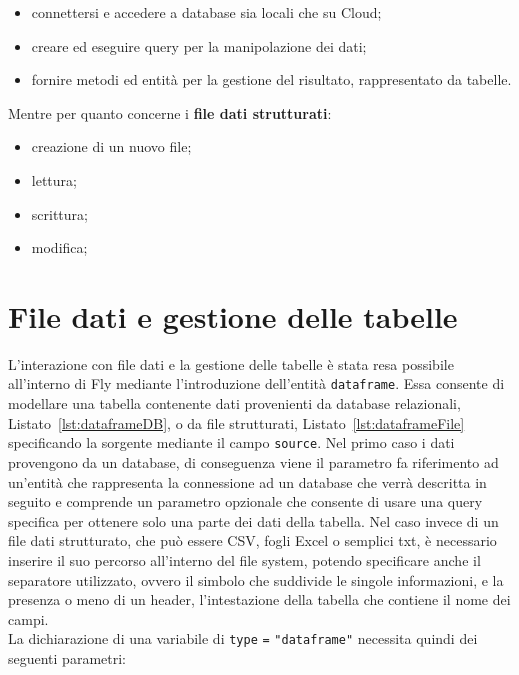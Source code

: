 \begin{itemize}
    \item connettersi e accedere a database sia locali che su Cloud;
    \item creare ed eseguire query per la manipolazione dei dati;
    \item fornire metodi ed entità per la gestione del risultato, rappresentato da tabelle.
\end{itemize}

Mentre per quanto concerne i \textbf{file dati strutturati}:

\begin{itemize}
    \item creazione di un nuovo file;
    \item lettura;
    \item scrittura;
    \item modifica;
\end{itemize}

\section{File dati e gestione delle tabelle}
L'interazione con file dati e la gestione delle tabelle è stata resa possibile all'interno di Fly mediante l'introduzione dell'entità \verb|dataframe|. Essa consente di modellare una tabella contenente dati provenienti da database relazionali, Listato~\ref{lst:dataframeDB}, o da file strutturati, Listato~\ref{lst:dataframeFile} specificando la sorgente mediante il campo \verb|source|. Nel primo caso i dati provengono da un database, di conseguenza viene il parametro fa riferimento ad un'entità che rappresenta la connessione ad un database che verrà descritta in seguito e comprende un parametro opzionale che consente di usare una query specifica per ottenere solo una parte dei dati della tabella. Nel caso invece di un file dati strutturato, che può essere CSV, fogli Excel o semplici txt, è necessario inserire il suo percorso all'interno del file system, potendo specificare anche il separatore utilizzato, ovvero il simbolo che suddivide le singole informazioni, e la presenza o meno di un header, l'intestazione della tabella che contiene il nome dei campi.\\
La dichiarazione di una variabile di \verb|type| \verb|=| \verb|"dataframe"| necessita quindi dei seguenti parametri:

